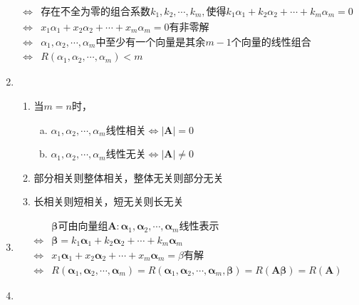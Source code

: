 \documentclass[12pt]{book}
\begin{document}
\begin{enumerate}[1.]
\begin{align*}
              \Leftrightarrow & \text{存在不全为零的组合系数}k_1,k_2,\cdots,k_m,\text{使得} k_1\alpha_1+k_2\alpha_2+\cdots+k_m\alpha_m=0 \\
              \Leftrightarrow & x_1\alpha_1+x_2\alpha_2+\cdots+x_m\alpha_m=0\text{有非零解}                                              \\
              \Leftrightarrow & \alpha_1,\alpha_2,\cdots,\alpha_{m}\text{中至少有一个向量是其余}m-1\text{个向量的线性组合}                      \\
              \Leftrightarrow & R(\alpha_1,\alpha_2,\cdots,\alpha_{m})<m
          \end{align*}
    \item
          \begin{enumerate}[(1)]
              \item 当$m=n$时，
                    \begin{enumerate}[a.]
                        \item $\alpha_1,\alpha_2,\cdots,\alpha_{m}$线性相关$\Leftrightarrow |\bm{A}|=0$
                        \item $\alpha_1,\alpha_2,\cdots,\alpha_{m}$线性无关$\Leftrightarrow |\bm{A}|\neq 0$
                    \end{enumerate}
              \item 部分相关则整体相关，整体无关则部分无关
              \item 长相关则短相关，短无关则长无关
          \end{enumerate}
    \item
          \begin{align*}
                              & \bm{\beta}\text{可由}\text{向量组}\bm{A}:\bm{\alpha}_1,\bm{\alpha}_2,\cdots,\bm{\alpha}_m\text{线性表示} \\
              \Leftrightarrow & \bm{\beta} = k_1\bm{\alpha}_1+k_2\bm{\alpha}_2+\cdots+k_m\bm{\alpha}_m                                        \\
              \Leftrightarrow & x_1\bm{\alpha}_1+x_2\bm{\alpha}_2+\cdots+x_m\bm{\alpha}_m=\beta\text{有解}                               \\
              \Leftrightarrow & R(\bm{\alpha}_1,\bm{\alpha}_2,\cdots,\bm{\alpha}_{m})=R(\bm{\alpha}_1,\bm{\alpha}_2,\cdots,\bm{\alpha}_{m},\bm{\beta}) = R(\bm{A \beta})=R(\bm{A})
          \end{align*}
    \item
          \begin{align*}

\end{align*}
\end{enumerate}
\end{document}
